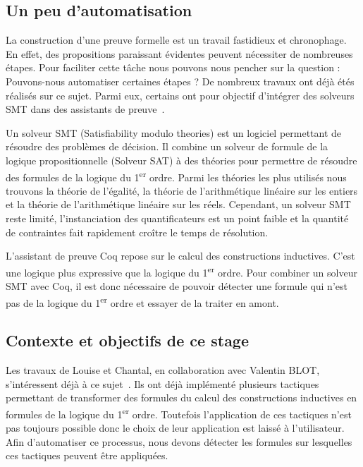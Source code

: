 \documentclass[french,titlepage]{article}
\begin{document}
\subsection{Un peu d'automatisation}
La construction d'une preuve formelle est un travail fastidieux et chronophage. En effet, des propositions paraissant évidentes peuvent nécessiter de nombreuses étapes.
Pour faciliter cette tâche nous pouvons nous pencher sur la question : Pouvons-nous automatiser certaines étapes ? De nombreux travaux ont déjà étés réalisés sur ce sujet. Parmi eux, certains ont pour objectif d'intégrer des solveurs SMT dans des assistants de preuve~\cite{DBLP:conf/cpp/ArmandFGKTW11}.

Un solveur SMT (Satisfiability modulo theories) est un logiciel permettant de résoudre des problèmes de décision. Il combine un solveur de formule de la logique propositionnelle (Solveur SAT) à des théories pour permettre de résoudre des formules de la logique du 1\textsuperscript{er} ordre. Parmi les théories les plus utilisés nous trouvons la théorie de l'égalité, la théorie de l'arithmétique linéaire sur les entiers et la théorie de l'arithmétique linéaire sur les réels. Cependant, un solveur SMT reste limité, l'instanciation des quantificateurs est un point faible et la quantité de contraintes fait rapidement croître le temps de résolution.

L'assistant de preuve Coq repose sur le calcul des constructions inductives. C'est une logique plus expressive que la logique du 1\textsuperscript{er} ordre. Pour combiner un solveur SMT avec Coq, il est donc nécessaire de pouvoir détecter une formule qui n'est pas de la logique du 1\textsuperscript{er} ordre et essayer de la traiter en amont.


\subsection{Contexte et objectifs de ce stage}
Les travaux de Louise et Chantal, en collaboration avec Valentin BLOT, s'intéressent déjà à ce sujet~\cite{DBLP:journals/corr/abs-2107-02353,DBLP:journals/corr/abs-2204-02643,DBLP:conf/cpp/Blot0CPKMV23}. Ils ont déjà implémenté plusieurs tactiques permettant de transformer des formules du calcul des constructions inductives en formules de la logique du 1\textsuperscript{er} ordre. Toutefois l'application de ces tactiques n'est pas toujours possible donc le choix de leur application est laissé à l'utilisateur. Afin d'automatiser ce processus, nous devons détecter les formules sur lesquelles ces tactiques peuvent être appliquées.
\end{document}
